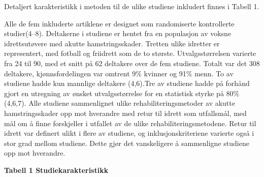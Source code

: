 \documentclass[
]{article}
\begin{document}
Detaljert karakteristikk i metoden til de ulike studiene inkludert
finnes i Tabell 1.

Alle de fem inkluderte artiklene er designet som randomiserte
kontrollerte studier(4--8). Deltakerne i studiene er hentet fra en
populasjon av voksne idrettsutøvere med akutte hamstringsskader. Tretten
ulike idretter er representert, med fotball og friidrett som de to
største. Utvalgsstørrelsen varierte fra 24 til 90, med et snitt på 62
deltakere over de fem studiene. Totalt var det 308 deltakere,
kjønnsfordelingen var omtrent 9\% kvinner og 91\% menn. To av studiene
hadde kun mannlige deltakere (4,6).Tre av studiene hadde på forhånd
gjort en utregning av ønsket utvalgsstørrelse for en statistisk styrke
på 80\% (4,6,7). Alle studiene sammenlignet ulike rehabiliteringsmetoder
av akutte hamstringsskader opp mot hverandre med retur til idrett som
utfallsmål, med mål om å finne forskjeller i utfallet av de ulike
rehabiliteringsmetodene. Retur til idrett var definert ulikt i flere av
studiene, og inklusjonskriteriene varierte også i stor grad mellom
studiene. Dette gjør det vanskeligere å sammenligne studiene opp mot
hverandre.

\textbf{Tabell 1 Studiekarakteristikk}
\end{document}
